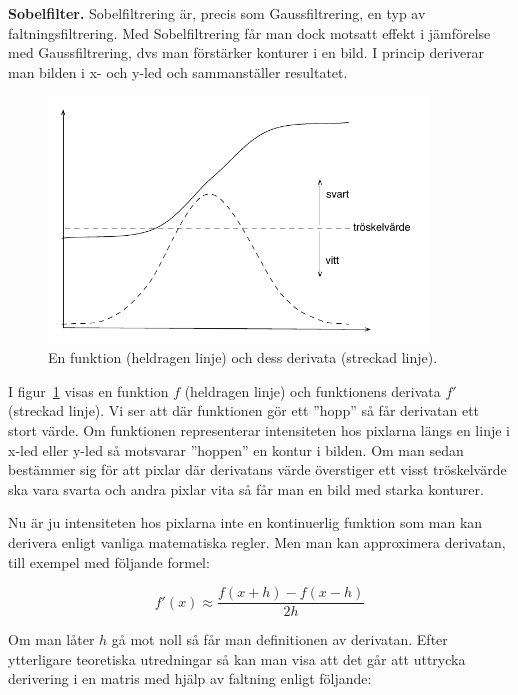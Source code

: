 \Task  \textbf{Sobelfilter.} Sobelfiltrering är, precis som Gaussfiltrering, en typ av faltningsfiltrering. Med Sobelfiltrering får man dock motsatt effekt i jämförelse med Gaussfiltrering, dvs man förstärker konturer i en bild. I princip deriverar man bilden i x- och y-led och sammanställer resultatet.

\begin{figure}[H]
\includegraphics[width=0.9\textwidth]{../img/w12-assignment-photo/derivatabild2.pdf}
\caption { En funktion (heldragen linje) och dess derivata (streckad linje).}
\label{fig:photo:sobelfilter:derivatabild}
\end{figure}

I figur~\ref{fig:photo:sobelfilter:derivatabild} visas en funktion $f$ (heldragen linje) och funktionens derivata $f'$ (streckad linje). Vi ser att där funktionen gör ett ''hopp'' så får derivatan ett stort värde. Om funktionen representerar intensiteten hos pixlarna längs en linje i x-led eller y-led så motsvarar ''hoppen'' en kontur i bilden. Om man sedan bestämmer sig för att pixlar där derivatans värde överstiger ett visst tröskelvärde ska vara svarta och andra pixlar vita så får man en bild med starka konturer.

Nu är ju intensiteten hos pixlarna inte en kontinuerlig funktion som man kan derivera enligt vanliga matematiska regler. Men man kan approximera derivatan, till exempel med följande formel:

\begin{displaymath}
f'(x) \approx \frac{f(x+h) - f(x-h)}{2h}
\end{displaymath}

Om man låter $h$ gå mot noll så får man definitionen av derivatan.
Efter ytterligare teoretiska utredningar så kan man visa att det går att uttrycka derivering i en matris med hjälp av faltning enligt följande:
% 

